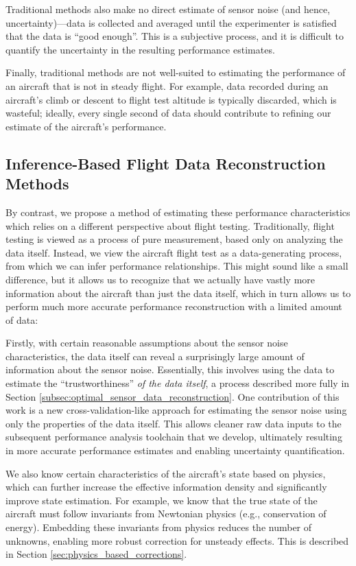 \documentclass[conf]{new-aiaa}
\begin{document}
    Traditional methods also make no direct estimate of sensor noise (and hence, uncertainty)—data is collected and averaged until the experimenter is satisfied that the data is ``good enough''. This is a subjective process, and it is difficult to quantify the uncertainty in the resulting performance estimates.

    Finally, traditional methods are not well-suited to estimating the performance of an aircraft that is not in steady flight. For example, data recorded during an aircraft's climb or descent to flight test altitude is typically discarded, which is wasteful; ideally, every single second of data should contribute to refining our estimate of the aircraft's performance.

    \subsection{Inference-Based Flight Data Reconstruction Methods}

    By contrast, we propose a method of estimating these performance characteristics which relies on a different perspective about flight testing. Traditionally, flight testing is viewed as a process of pure measurement, based only on analyzing the data itself. Instead, we view the aircraft flight test as a data-generating process, from which we can infer performance relationships. This might sound like a small difference, but it allows us to recognize that we actually have vastly more information about the aircraft than just the data itself, which in turn allows us to perform much more accurate performance reconstruction with a limited amount of data:

    Firstly, with certain reasonable assumptions about the sensor noise characteristics, the data itself can reveal a surprisingly large amount of information about the sensor noise. Essentially, this involves using the data to estimate the ``trustworthiness'' \emph{of the data itself}, a process described more fully in Section \ref{subsec:optimal_sensor_data_reconstruction}. One contribution of this work is a new cross-validation-like approach for estimating the sensor noise using only the properties of the data itself. This allows cleaner raw data inputs to the subsequent performance analysis toolchain that we develop, ultimately resulting in more accurate performance estimates and enabling uncertainty quantification.

    We also know certain characteristics of the aircraft's state based on physics, which can further increase the effective information density and significantly improve state estimation. For example, we know that the true state of the aircraft must follow invariants from Newtonian physics (e.g., conservation of energy). Embedding these invariants from physics reduces the number of unknowns, enabling more robust correction for unsteady effects. This is described in Section \ref{sec:physics_based_corrections}.
\end{document}
